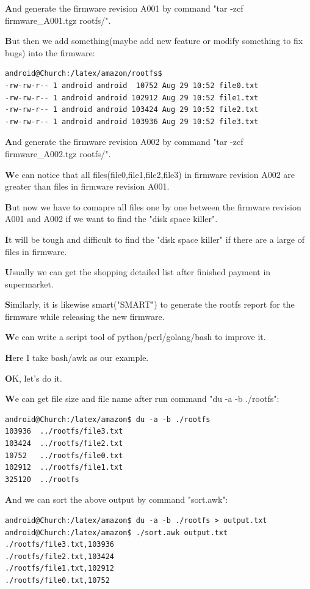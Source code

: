 \documentclass{article}
\begin{document}
\textbf
And generate the firmware revision A001 by command "tar -zcf firmware\_A001.tgz rootfs/".


\textbf
But then we add something(maybe add new feature or modify something to fix bugs) into the firmware:


\begin{lstlisting}[language={[ansi]C}]
android@Church:/latex/amazon/rootfs$
-rw-rw-r-- 1 android android  10752 Aug 29 10:52 file0.txt
-rw-rw-r-- 1 android android 102912 Aug 29 10:52 file1.txt
-rw-rw-r-- 1 android android 103424 Aug 29 10:52 file2.txt
-rw-rw-r-- 1 android android 103936 Aug 29 10:52 file3.txt
    \end{lstlisting}

\textbf
And generate the firmware revision A002 by command "tar -zcf firmware\_A002.tgz rootfs/".

\textbf
We can notice that all files(file0,file1,file2,file3) in firmware revision A002 are greater than files in firmware revision A001.

\textbf
But now we have to comapre all files one by one between the firmware revision A001 and A002 if we want to find the "disk space killer".

\textbf
It will be tough and difficult to find the "disk space killer" if there are a large of files in firmware.

\textbf
Usually we can get the shopping detailed list after finished payment in supermarket.

\textbf
Similarly, it is likewise smart("SMART") to generate the rootfs report for the firmware while releasing the new firmware.

\textbf
We can write a script tool of python/perl/golang/bash to improve it.

\textbf
Here I take bash/awk as our example.

\textbf
OK, let's do it.

    
\textbf
We can get file size and file name after run command "du -a -b ./rootfs":

    
\begin{lstlisting}[language={[ansi]C}]
android@Church:/latex/amazon$ du -a -b ./rootfs
103936	../rootfs/file3.txt
103424	../rootfs/file2.txt
10752	../rootfs/file0.txt
102912	../rootfs/file1.txt
325120	../rootfs
    \end{lstlisting}

\textbf
And we can sort the above output by command "sort.awk":

\begin{lstlisting}[language={[ansi]C}]
android@Church:/latex/amazon$ du -a -b ./rootfs > output.txt
android@Church:/latex/amazon$ ./sort.awk output.txt
./rootfs/file3.txt,103936
./rootfs/file2.txt,103424
./rootfs/file1.txt,102912
./rootfs/file0.txt,10752
    \end{lstlisting}
\end{document}
